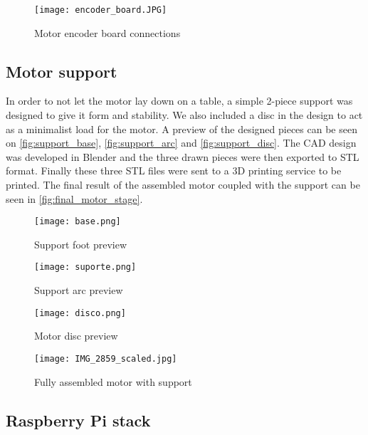 \begin{figure}[htp]
	\centering
	\texttt{[image: encoder\_board.JPG]}
	\caption{Motor encoder board connections}
	\label{fig:encoder_board}
\end{figure}

\subsection{Motor support}
In order to not let the motor lay down on a table, a simple 2-piece support was designed to give it form and stability.
We also included a disc in the design to act as a minimalist load for the motor.
A preview of the designed pieces can be seen on \autoref{fig:support_base}, \autoref{fig:support_arc} and \autoref{fig:support_disc}.
The CAD design was developed in Blender \cite{sw:blender} and the three drawn pieces were then exported to STL format.
Finally these three STL files were sent to a 3D printing service to be printed.
The final result of the assembled motor coupled with the support can be seen in \autoref{fig:final_motor_stage}.

\begin{figure}[htp]
	\centering
	\texttt{[image: base.png]}
	\caption{Support foot preview}
	\label{fig:support_base}
\end{figure}
\begin{figure}[htp]
	\centering
	\texttt{[image: suporte.png]}
	\caption{Support arc preview}
	\label{fig:support_arc}
\end{figure}
\begin{figure}[htp]
	\centering
	\texttt{[image: disco.png]}
	\caption{Motor disc preview}
	\label{fig:support_disc}
\end{figure}
\begin{figure}[htp]
	\centering
	\texttt{[image: IMG\_2859\_scaled.jpg]}
	\caption{Fully assembled motor with support}
	\label{fig:final_motor_stage}
\end{figure}

\subsection{Raspberry Pi stack}

